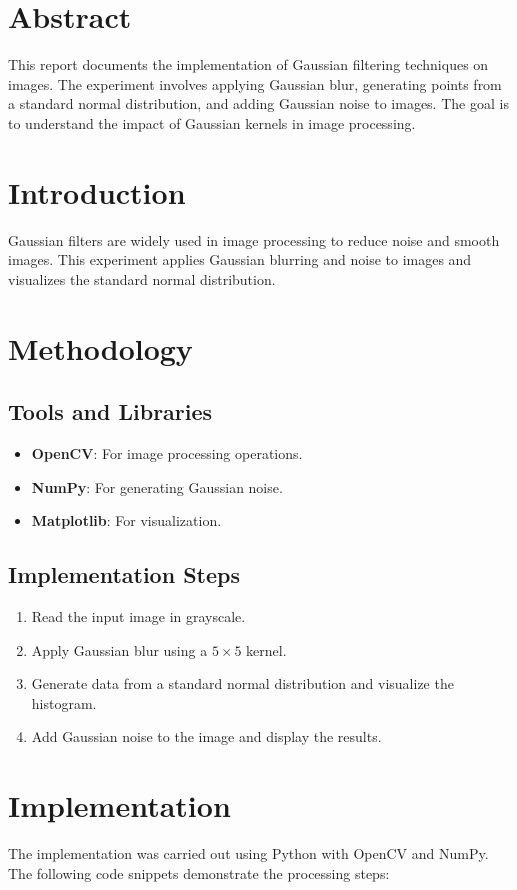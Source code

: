 \documentclass{report}
\begin{document}
\section{Abstract}
This report documents the implementation of Gaussian filtering techniques on images. The experiment involves applying Gaussian blur, generating points from a standard normal distribution, and adding Gaussian noise to images. The goal is to understand the impact of Gaussian kernels in image processing.

\section{Introduction}
Gaussian filters are widely used in image processing to reduce noise and smooth images. This experiment applies Gaussian blurring and noise to images and visualizes the standard normal distribution.

\section{Methodology}
\subsection{Tools and Libraries}
\begin{itemize}
    \item \textbf{OpenCV}: For image processing operations.
    \item \textbf{NumPy}: For generating Gaussian noise.
    \item \textbf{Matplotlib}: For visualization.
\end{itemize}

\subsection{Implementation Steps}
\begin{enumerate}
    \item Read the input image in grayscale.
    \item Apply Gaussian blur using a $5\times5$ kernel.
    \item Generate data from a standard normal distribution and visualize the histogram.
    \item Add Gaussian noise to the image and display the results.
\end{enumerate}

\section{Implementation}
The implementation was carried out using Python with OpenCV and NumPy. The following code snippets demonstrate the processing steps:
\end{document}
